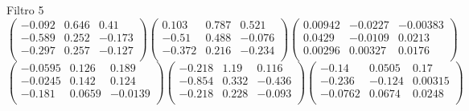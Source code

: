 Filtro 5
{ \small
\[
\begin{pmatrix}
  -0.092 & 0.646 & 0.41 \\
  -0.589 & 0.252 & -0.173 \\
  -0.297 & 0.257 & -0.127 \\
\end{pmatrix}
\begin{pmatrix}
  0.103 & 0.787 & 0.521 \\
  -0.51 & 0.488 & -0.076 \\
  -0.372 & 0.216 & -0.234 \\
\end{pmatrix}
\begin{pmatrix}
  0.00942 & -0.0227 & -0.00383 \\
  0.0429 & -0.0109 & 0.0213 \\
  0.00296 & 0.00327 & 0.0176 \\
\end{pmatrix}
\]
\[
\begin{pmatrix}
  -0.0595 & 0.126 & 0.189 \\
  -0.0245 & 0.142 & 0.124 \\
  -0.181 & 0.0659 & -0.0139 \\
\end{pmatrix}
\begin{pmatrix}
  -0.218 & 1.19 & 0.116 \\
  -0.854 & 0.332 & -0.436 \\
  -0.218 & 0.228 & -0.093 \\
\end{pmatrix}
\begin{pmatrix}
  -0.14 & 0.0505 & 0.17 \\
  -0.236 & -0.124 & 0.00315 \\
  -0.0762 & 0.0674 & 0.0248 \\
\end{pmatrix}
\]
}

